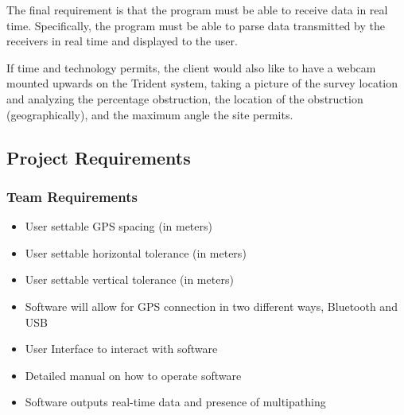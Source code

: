 \documentclass[12pt]{article}
\begin{document}
The final requirement is that the program must be able to receive data in real time. Specifically, the program must be able to parse data transmitted by the receivers in real time and displayed to the user. 
 
If time and technology permits, the client would also like to have a webcam mounted upwards on the Trident system, taking a picture of the survey location and analyzing the percentage obstruction, the location of the obstruction (geographically), and the maximum angle the site permits.  
\clearpage
\subsection{Project Requirements}
\subsubsection{Team Requirements}
\begin{itemize}
\item User settable GPS spacing (in meters) 
\item User settable horizontal tolerance (in meters) 
\item User settable vertical tolerance (in meters) 
\item Software will allow for GPS connection in two different ways, Bluetooth and USB 
\item User Interface to interact with software 
\item Detailed manual on how to operate software 
\item Software outputs real-time data and presence of multipathing 
\end{itemize}
\end{document}
